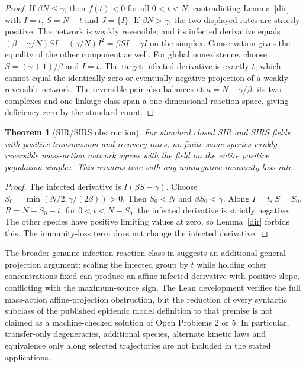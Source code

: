 \documentclass[11pt]{article}
\newtheorem{theorem}{Theorem}[section]
\begin{document}
\begin{proof}
If $\beta N\leq\gamma$, then $f(t)<0$ for all $0<t<N$, contradicting Lemma~\ref{dir} with $I=t$, $S=N-t$ and $J=\{I\}$. If $\beta N>\gamma$, the two displayed rates are strictly positive. The network is weakly reversible, and its infected derivative equals $(\beta-\gamma/N)SI-(\gamma/N)I^2=\beta SI-\gamma I$ on the simplex. Conservation gives the equality of the other component as well. For global nonexistence, choose $S=(\gamma+1)/\beta$ and $I=t$. The target infected derivative is exactly $t$, which cannot equal the identically zero or eventually negative projection of a weakly reversible network. The reversible pair also balances at $a=N-\gamma/\beta$; its two complexes and one linkage class span a one-dimensional reaction space, giving deficiency zero by the standard count.
\end{proof}
\begin{theorem}[SIR/SIRS obstruction]\label{sir}
For standard closed SIR and SIRS fields with positive transmission and recovery rates, no finite same-species weakly reversible mass-action network agrees with the field on the entire positive population simplex. This remains true with any nonnegative immunity-loss rate.
\end{theorem}
\begin{proof}
The infected derivative is $I(\beta S-\gamma)$. Choose $S_0=\min(N/2,\gamma/(2\beta))>0$. Then $S_0<N$ and $\beta S_0<\gamma$. Along $I=t$, $S=S_0$, $R=N-S_0-t$, for $0<t<N-S_0$, the infected derivative is strictly negative. The other species have positive limiting values at zero, so Lemma~\ref{dir} forbids this. The immunity-loss term does not change the infected derivative.
\end{proof}

The broader genuine-infection reaction class in \cite{avram24} suggests an additional general projection argument: scaling the infected group by $t$ while holding other concentrations fixed can produce an affine infected derivative with positive slope, conflicting with the maximum-source sign. The Lean development verifies the full mass-action affine-projection obstruction, but the reduction of every syntactic subclass of the published epidemic model definition to that premise is not claimed as a machine-checked solution of Open Problems 2 or 5. In particular, transfer-only degeneracies, additional species, alternate kinetic laws and equivalence only along selected trajectories are not included in the stated applications.
\end{document}
